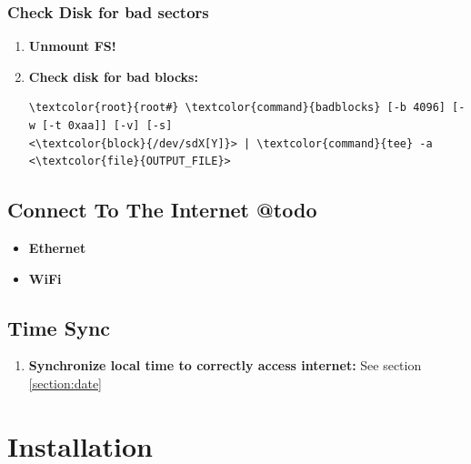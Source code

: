 \documentclass[10pt, a4paper, onecolumn, oneside, titlepage, openany]{book}
\begin{document}
\subsection{Check Disk for bad sectors}
\begin{enumerate}
    \item \textbf{Unmount FS!}
    \item \textbf{Check disk for bad blocks:}
\begin{Verbatim}[commandchars=\\\{\}]
\textcolor{root}{root#} \textcolor{command}{badblocks} [-b 4096] [-w [-t 0xaa]] [-v] [-s]
<\textcolor{block}{/dev/sdX[Y]}> | \textcolor{command}{tee} -a <\textcolor{file}{OUTPUT_FILE}>
\end{Verbatim}
\end{enumerate}

\section{Connect To The Internet @todo}
\begin{itemize}
    \item \textbf{Ethernet}

    \item \textbf{WiFi}
\end{itemize}

\section{Time Sync}
\begin{enumerate}
    \item \textbf{Synchronize local time to correctly access internet:}
\newline See section \ref{section:date}
\end{enumerate}


\chapter{Installation}
\end{document}
